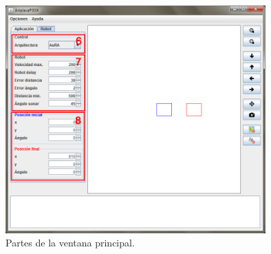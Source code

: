 \documentclass[11pt,twoside,A5]{article}
\begin{document}
\begin{figure}[H]
\begin{center}
\includegraphics[width=10cm]{ventana-principal2-partes.png} 
\caption{Partes de la ventana principal.}
\label{fig:ventana-principal2}
\end{center}
\end{figure} 
\end{document}
